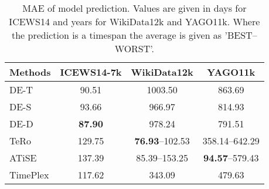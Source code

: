 \begin{table}[htb]
\centering
\begin{minipage}{0.95\columnwidth}
\centering
\caption{MAE of model prediction. Values are given in days for ICEWS14 and years for WikiData12k and YAGO11k. Where the prediction is a timespan the average is given as '\textsc{BEST}–\textsc{WORST}'.}
\vspace{-3mm}

\begin{tabular}{lccc}
\hline
Methods & ICEWS14-7k & WikiData12k & YAGO11k\\
\hline
DE-T & 90.51 & 1003.50 & 863.69\\
DE-S & 93.66 & 966.97 & 814.93\\
DE-D & \textbf{87.90} & 978.24 & 791.51\\
TeRo & 129.75 & \textbf{76.93}–102.53 & 358.14–642.29\\
ATiSE & 137.39 & 85.39–153.25 & \textbf{94.57}–579.43\\
TimePlex & 117.62 & 343.09 & 479.63\\
\hline
\end{tabular}


\label{tab:time_prediction_mae}
\end{minipage}
\end{table}